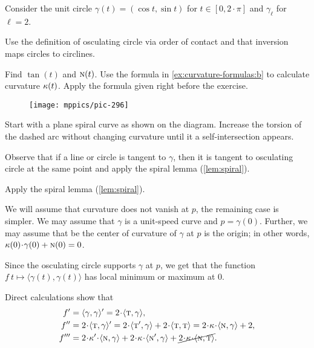 Consider the unit circle $\gamma(t)=(\cos t,\sin t)$ for $t\in[0,2\cdot\pi]$ and $\gamma_\ell$ for $\ell=2$.

Use the definition of osculating circle via order of contact and that inversion maps circles to circlines. 

Find $\tan(t)$ and $\textsc{n}(t)$.
Use the formula in \ref{ex:curvature-formulas:b} to calculate curvature $\kappa(t)$.
Apply the formula given right before the exercise.

\begin{wrapfigure}{r}{15 mm}
\vskip-0mm
\centering
\texttt{[image: mppics/pic-296]}
\vskip0mm
\end{wrapfigure}

 Start with a plane spiral curve as shown on the diagram.
Increase the torsion of the dashed arc without changing curvature until it a self-intersection appears.

Observe that if a line or circle is tangent to $\gamma$,
then it is tangent to osculating circle at the same point
and apply the spiral lemma (\ref{lem:spiral}).

Apply the spiral lemma (\ref{lem:spiral}).

We will assume that curvature does not vanish at $p$, the remaining case is simpler.
We may assume that $\gamma$ is a unit-speed curve and $p=\gamma(0)$.
Further, we may assume that be the center of curvature of $\gamma$ at $p$ is the origin;
in other words, $\kappa(0)\cdot\gamma(0)+ \norm(0)=0$.

Since the osculating circle supports $\gamma$ at $p$,
we get that the function $f\:t\mapsto \langle\gamma(t),\gamma(t)\rangle$ has local minimum or maximum at $0$.

Direct calculations show that 
\begin{align*}
f'
&=\langle\gamma,\gamma\rangle'
=2\cdot\langle\tan,\gamma\rangle,
\\
f''
&=2\cdot\langle\tan,\gamma\rangle'
=2\cdot\langle\tan',\gamma\rangle+2\cdot\langle\tan,\tan\rangle
=2\cdot\kappa\cdot\langle\norm,\gamma\rangle+2,
\\
f'''
&=2\cdot\kappa'\cdot\langle\norm,\gamma\rangle
+2\cdot\kappa\cdot\langle\norm',\gamma\rangle+\cancel{2\cdot\kappa\cdot\langle\norm,\tan\rangle}.
\end{align*}

